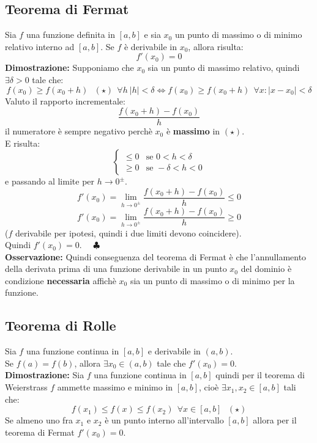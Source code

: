 \documentclass[../../main.tex]{subfiles}
\begin{document}
\subsection{Teorema di Fermat}
Sia $f$ una funzione definita in $[a, b]$ e sia $x_0$ un punto di massimo o di minimo relativo interno ad $[a, b]$.
Se $f$ è derivabile in $x_0$, allora risulta:
\[
    f'(x_0) = 0
\]
\textbf{Dimostrazione:} Supponiamo che $x_0$ sia un punto di massimo relativo, quindi $\exists \delta > 0$ tale che:
\[
    f(x_0) \geq f(x_0 + h) \ \ \ (\star) \ \ \forall h \ |h|<\delta \iff f(x_0)\geq f(x_0 + h) \ \ \forall x: |x-x_0|<\delta
\]
Valuto il rapporto incrementale:
\[
    \dfrac{f(x_0 + h) - f(x_0)}{h}
\]
il numeratore è sempre negativo perchè $x_0$ è \textbf{massimo} in $(\star)$.\\
E risulta:
\[
    \begin{cases}
        \leq 0 & \text{se } 0 < h < \delta  \\
        \geq 0 & \text{se } -\delta < h < 0
    \end{cases}
\]
e passando al limite per $h\to0^{\pm}$.\\
\[f'(x_0) = \lim_{h\to0^{\pm}}\dfrac{f(x_0 + h) - f(x_0)}{h} \leq 0\]
\[f'(x_0) = \lim_{h\to0^{\pm}}\dfrac{f(x_0 + h) - f(x_0)}{h} \geq 0\]
($f$ derivabile per ipotesi, quindi i due limiti devono coincidere).\\
Quindi $f'(x_0) = 0$. \ \ $\clubsuit$\\
\textbf{Osservazione:} Quindi conseguenza del teorema di Fermat è che l'annullamento della derivata prima di una funzione derivabile in un punto $x_0$ del dominio è condizione \textbf{necessaria} affichè
$x_0$ sia un punto di massimo o di minimo per la funzione.\\

\subsection{Teorema di Rolle}
Sia $f$ una funzione continua in $[a, b]$ e derivabile in $(a, b)$.\\
Se $f(a) = f(b)$, allora $\exists x_0\in(a, b)$ tale che $f'(x_0) = 0$.\\
\textbf{Dimostrazione:} Sia $f$ una funzione continua in $[a, b]$ quindi per il teorema di Weierstrass $f$ ammette massimo e minimo in $[a, b]$, cioè $\exists x_1, x_2\in[a, b]$ tali che:
\[
    f(x_1) \leq f(x) \leq f(x_2) \ \ \forall x\in[a, b] \ \ \ (\star)
\]
Se almeno uno fra $x_1$ e $x_2$ è un punto interno all'intervallo $[a, b]$ allora per il teorema di Fermat $f'(x_0) = 0$.\\
\end{document}
